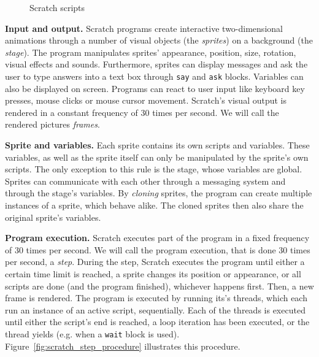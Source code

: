 \begin{figure}[htpb]
    \centering
    \caption{Scratch scripts}
    \label{fig:scratch_code}
\end{figure}

\textbf{Input and output.}
Scratch programs create interactive two-dimensional animations through a number of visual objects (the \textit{sprites}) on a background (the \textit{stage}).
The program manipulates sprites' appearance, position, size, rotation, visual effects and sounds.
Furthermore, sprites can display messages and ask the user to type answers into a text box through \texttt{say} and \texttt{ask} blocks.
Variables can also be displayed on screen.
Programs can react to user input like keyboard key presses, mouse clicks or mouse cursor movement.
Scratch's visual output is rendered in a constant frequency of 30 times per second.
We will call the rendered pictures \textit{frames}.
\parspace

\textbf{Sprite and variables.}
Each sprite contains its own scripts and variables.
These variables, as well as the sprite itself can only be manipulated by the sprite's own scripts.
The only exception to this rule is the stage, whose variables are global.
Sprites can communicate with each other through a messaging system and through the stage's variables.
By \textit{cloning} sprites, the program can create multiple instances of a sprite, which behave alike.
The cloned sprites then also share the original sprite's variables.
\parspace

\textbf{Program execution.}
Scratch executes part of the program in a fixed frequency of 30 times per second.
We will call the program execution, that is done 30 times per second, a \textit{step}.
During the step, Scratch executes the program until either a certain time limit is reached,
a sprite changes its position or appearance, or all scripts are done (and the program finished), whichever happens first.
Then, a new frame is rendered.
The program is executed by running its's threads, which each run an instance of an active script, sequentially.
Each of the threads is executed until either the script's end is reached,
a loop iteration has been executed, or the thread yields (e.g. when a \texttt{wait} block is used).
Figure~\ref{fig:scratch_step_procedure} illustrates this procedure.
\parspace

